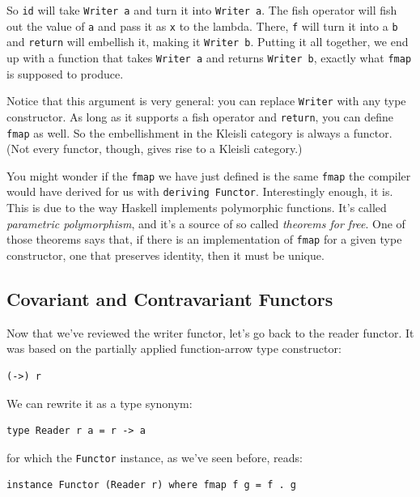 So \texttt{id} will take \texttt{Writer\ a} and turn it into
\texttt{Writer\ a}. The fish operator will fish out the value of
\texttt{a} and pass it as \texttt{x} to the lambda. There, \texttt{f}
will turn it into a \texttt{b} and \texttt{return} will embellish it,
making it \texttt{Writer\ b}. Putting it all together, we end up with a
function that takes \texttt{Writer\ a} and returns \texttt{Writer\ b},
exactly what \texttt{fmap} is supposed to produce.

Notice that this argument is very general: you can replace
\texttt{Writer} with any type constructor. As long as it supports a fish
operator and \texttt{return}, you can define \texttt{fmap} as well. So
the embellishment in the Kleisli category is always a functor. (Not
every functor, though, gives rise to a Kleisli category.)

You might wonder if the \texttt{fmap} we have just defined is the same
\texttt{fmap} the compiler would have derived for us with
\texttt{deriving\ Functor}. Interestingly enough, it is. This is due to
the way Haskell implements polymorphic functions. It's called
\emph{parametric polymorphism}, and it's a source of so called
\emph{theorems for free}. One of those theorems says that, if there is
an implementation of \texttt{fmap} for a given type constructor, one
that preserves identity, then it must be unique.

\subsection{Covariant and Contravariant
Functors}\label{covariant-and-contravariant-functors}

Now that we've reviewed the writer functor, let's go back to the reader
functor. It was based on the partially applied function-arrow type
constructor:

\begin{verbatim}
(->) r
\end{verbatim}

We can rewrite it as a type synonym:

\begin{verbatim}
type Reader r a = r -> a
\end{verbatim}

for which the \texttt{Functor} instance, as we've seen before, reads:

\begin{verbatim}
instance Functor (Reader r) where fmap f g = f . g
\end{verbatim}

